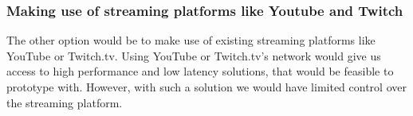 

\subsubsection{Making use of streaming platforms like Youtube and Twitch}
The other option would be to make use of existing streaming platforms like YouTube or Twitch.tv. Using YouTube or Twitch.tv's network would give us access to high performance and low latency solutions, that would be feasible to prototype with. However, with such a solution we would have limited control over the streaming platform.


        
